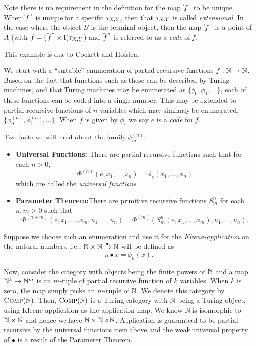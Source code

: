 Note there is no requirement in the definition for the map ${}^\ulcorner\!\!f^\urcorner$ to be unique. When ${}^\ulcorner\!\!f^\urcorner$ is unique
for a specific $\tau_{{X},{Y}}$, then that $\tau_{{X},{Y}}$ is called \emph{extensional}. In the case where the object
$B$ is the terminal object, then the map ${}^\ulcorner\!\!f^\urcorner$ is a point of $A$ (with $f = ({}^\ulcorner\!\!f^\urcorner \times 1)\tau_{{X},{Y}}$) and
${}^\ulcorner\!\!f^\urcorner$ is referred to as a \emph{code} of $f$.

\begin{example}\label{ex:turing-category-kleene}
  This example is due to Cockett and Hofstra\cite{cockett-hostra08-intro-to-turing}.

  We start with a ``suitable'' enumeration of partial recursive functions $f:\mathbb{N}\to\mathbb{N}$. Based on
  the fact that functions such as these can be described by Turing machines, and that Turing
  machines may be enumerated as $\{\phi_0,\phi_1,\ldots\}$, each of these functions can be coded
  into a single number. This may be extended to partial recursive functions of $n$ variables which
  may similarly be enumerated, $\{\phi_0^{(n)},\phi_1^{(n)},\ldots\}$. When $f$ is given by $\phi_e$
  we say $e$ is a \emph{code} for $f$.

  Two facts we will need about the family $\phi_m^{(n)}$:
  \begin{itemize}
    \item \textbf{Universal Functions:} There are partial recursive functions such that for each $n > 0$,
      \[ \Phi^{(n)}(e,x_1,\ldots,x_n) = \phi_e(x_1,\ldots,x_n) \]
      which are called the \emph{universal functions}.
    \item \textbf{Parameter Theorem:}There are primitive recursive functions $S_m^n$ for each $n,m >
      0$ such that
      \[ \Phi^{(n+m)}(e,x_1,\ldots,x_m,u_1,\ldots,u_n) = \Phi^{(m)}(S_m^n(e,x_1,\ldots,x_m),u_1,\ldots,u_n).\]
  \end{itemize}

  Suppose we choose such an enumeration and use it for the \emph{Kleene-application} on the natural
  numbers, i.e., $\mathbb{N}\times\mathbb{N}\xrightarrow{\bullet}\mathbb{N}$ will be defined as
  \[
    n\bullet x = \phi_n(x).
  \]

  Now, consider the category with objects being the finite powers of $\mathbb{N}$ and a map $\mathbb{N}^k \to
  \mathbb{N}^m$ is an $m$-tuple of partial recursive function of $k$ variables. When $k$ is zero, the map
  simply picks an $m$-tuple of $\mathbb{N}$. We denote this category by $\textsc{Comp}(\mathbb{N})$.
  Then, $\textsc{Comp}(\mathbb{N})$ is a Turing category with $\mathbb{N}$ being a Turing object, using Kleene-application
  as the application map. We know $\mathbb{N}$ is isomorphic to $\mathbb{N}\times \mathbb{N}$ and hence we have $\mathbb{N}\times \mathbb{N}
  \triangleleft \mathbb{N}$. Application is guaranteed to be partial recursive by the universal functions item
  above and the weak universal property of $\bullet$ is a result of the Parameter Theorem.
\end{example}

